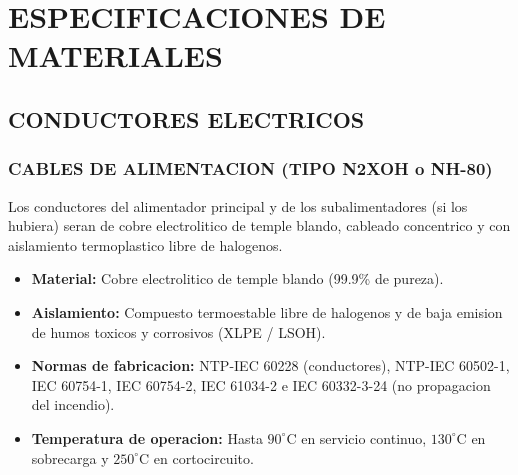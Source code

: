 \chapter*{ESPECIFICACIONES DE MATERIALES}

\setcounter{section}{0}
\renewcommand{\thesection}{3.\arabic{section}.}
\renewcommand{\thesubsection}{3.\arabic{section}.\arabic{subsection}.}
\renewcommand{\thesubsubsection}{3.\arabic{section}.\arabic{subsection}.\arabic{subsubsection}.}
\renewcommand{\theHsection}{materiales.\arabic{section}}
\renewcommand{\theHsubsection}{materiales.\arabic{section}.\arabic{subsection}}
\renewcommand{\theHsubsubsection}{materiales.\arabic{section}.\arabic{subsection}.\arabic{subsubsection}}

\section{CONDUCTORES ELECTRICOS}

\subsection{CABLES DE ALIMENTACION (TIPO N2XOH o NH-80)}
Los conductores del alimentador principal y de los subalimentadores (si los hubiera) seran de cobre electrolitico de temple blando, cableado concentrico y con aislamiento termoplastico libre de halogenos.
\begin{itemize}
  \item \textbf{Material:} Cobre electrolitico de temple blando (99.9\% de pureza).
  \item \textbf{Aislamiento:} Compuesto termoestable libre de halogenos y de baja emision de humos toxicos y corrosivos (XLPE / LSOH).
  \item \textbf{Normas de fabricacion:} NTP-IEC 60228 (conductores), NTP-IEC 60502-1, IEC 60754-1, IEC 60754-2, IEC 61034-2 e IEC 60332-3-24 (no propagacion del incendio).
  \item \textbf{Temperatura de operacion:} Hasta \(90^\circ\text{C}\) en servicio continuo, \(130^\circ\text{C}\) en sobrecarga y \(250^\circ\text{C}\) en cortocircuito.
\end{itemize}

